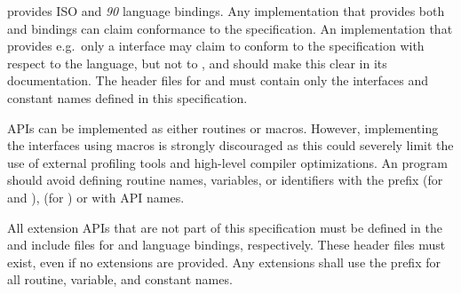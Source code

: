 \openshmem provides ISO \Clang{} and \Fortran{} \textit{90} language bindings.
Any implementation that provides both \Clang{} and \Fortran{} bindings can claim
conformance to the specification. An implementation that provides e.g.\ only a
\Clang{} interface may claim to conform to the \openshmem specification with
respect to the \Clang{} language, but not to \Fortran, and should make this
clear in its documentation. The \openshmem header files for \Clang{} and
\Fortran{} must contain only the interfaces and constant names defined in this
specification.

\openshmem \ac{API}s can be implemented as either routines or macros. However,
implementing the interfaces using macros is strongly discouraged as this could
severely limit the use of external profiling tools and high-level compiler
optimizations. An \openshmem program should avoid defining routine names,
variables, or identifiers with the prefix \shmemprefix (for \Clang{} and
\Fortran), \shmemprefixC (for \Clang) or with \openshmem \ac{API} names.

All \openshmem extension \ac{API}s that are not part of this specification must
be defined in the  and  include files for
\Clang{} and \Fortran{} language bindings, respectively.  These header files
must exist, even if no extensions are provided.  Any extensions shall use the
 prefix for all routine, variable, and constant names.
